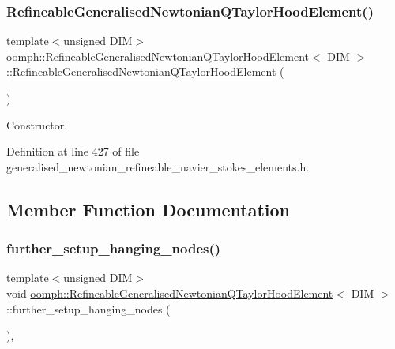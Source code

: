 \subsubsection{\texorpdfstring{Refineable\+Generalised\+Newtonian\+Q\+Taylor\+Hood\+Element()}{RefineableGeneralisedNewtonianQTaylorHoodElement()}}
{\footnotesize\ttfamily template$<$unsigned D\+IM$>$ \\
\hyperlink{classoomph_1_1RefineableGeneralisedNewtonianQTaylorHoodElement}{oomph\+::\+Refineable\+Generalised\+Newtonian\+Q\+Taylor\+Hood\+Element}$<$ D\+IM $>$\+::\hyperlink{classoomph_1_1RefineableGeneralisedNewtonianQTaylorHoodElement}{Refineable\+Generalised\+Newtonian\+Q\+Taylor\+Hood\+Element} (\begin{DoxyParamCaption}{ }\end{DoxyParamCaption})\hspace{0.3cm}{\ttfamily [inline]}}



Constructor. 



Definition at line 427 of file generalised\+\_\+newtonian\+\_\+refineable\+\_\+navier\+\_\+stokes\+\_\+elements.\+h.



\subsection{Member Function Documentation}
\mbox{\label{classoomph_1_1RefineableGeneralisedNewtonianQTaylorHoodElement_a1b26f16b86c5d72d9da4bf2c2b7741d0}} 
\subsubsection{\texorpdfstring{further\+\_\+setup\+\_\+hanging\+\_\+nodes()}{further\_setup\_hanging\_nodes()}}
{\footnotesize\ttfamily template$<$unsigned D\+IM$>$ \\
void \hyperlink{classoomph_1_1RefineableGeneralisedNewtonianQTaylorHoodElement}{oomph\+::\+Refineable\+Generalised\+Newtonian\+Q\+Taylor\+Hood\+Element}$<$ D\+IM $>$\+::further\+\_\+setup\+\_\+hanging\+\_\+nodes (\begin{DoxyParamCaption}{ }\end{DoxyParamCaption})\hspace{0.3cm}{\ttfamily [inline]}, {\ttfamily [virtual]}}



